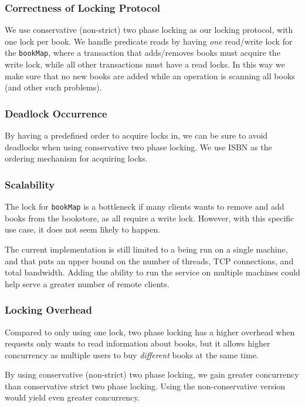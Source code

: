 \documentclass[11pt,a4paper,english]{article}
\begin{document}
\subsubsection{Correctness of Locking Protocol}

We use conservative (non-strict) two phase locking as our locking protocol, with
one lock per book. We handle predicate reads by having \emph{one} read/write
lock for the \texttt{bookMap}, where a transaction that adds/removes books must
acquire the write lock, while all other transactions must have a read locks. In
this way we make sure that no new books are added while an operation is scanning
all books (and other such problems).

\subsubsection{Deadlock Occurrence}

%

By having a predefined order to acquire locks in, we can be sure to avoid
deadlocks when using conservative two phase locking. We use ISBN as the ordering
mechanism for acquiring locks.

\subsubsection{Scalability}

The lock for \texttt{bookMap} is a bottleneck if many clients wants to remove
and add books from the bookstore, as all require a write lock. However, with
this specific use case, it does not seem likely to happen.

The current implementation is still limited to a being run on a single machine,
and that puts an upper bound on the number of threads, TCP connections, and
total bandwidth. Adding the ability to run the service on multiple machines
could help serve a greater number of remote clients.

\subsubsection{Locking Overhead}

Compared to only using one lock, two phase locking has a higher overhead when
requests only wants to read information about books, but it allows higher
concurrency as multiple users to buy \emph{different} books at the same time.

By using conservative (non-strict) two phase locking, we gain greater
concurrency than conservative strict two phase locking. Using the
non-conservative version would yield even greater concurrency.
\end{document}
